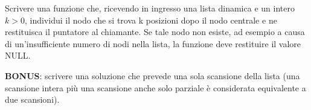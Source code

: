 \begin{Exercise}[label={ex:trova_k}]
    Scrivere una funzione che, ricevendo in ingresso una lista dinamica e un intero 
    $k > 0$, individui il nodo che si trova k posizioni dopo il nodo centrale 
    e ne restituisca il puntatore al chiamante. 
    Se tale nodo non esiste, ad esempio a causa di un’insufficiente numero di nodi 
    nella lista, la funzione deve restituire il valore NULL.
    
    \textbf{BONUS}: scrivere una soluzione che prevede una sola scansione 
    della lista (una scansione intera più una scansione anche solo parziale 
    è considerata equivalente a due scansioni).
\end{Exercise}

\begin{Answer}[ref={ex:trova_k}]
  	
\end{Answer}